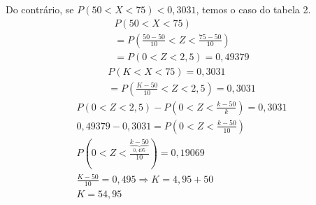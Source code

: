 \begin{example}
\begin{enumerate}[label=(\alph*)]
              Do contrário, se $P(50 < X < 75) < 0,3031$, temos o caso do tabela 2.
              \begin{align*}
                P(50 < X < 75)  \\
                =P(\frac{50-50}{10} < Z < \frac{75-50}{10}) \\
                =P(0 < Z < 2,5) = 0,49379
              \end{align*}
              \begin{align*}
                P(K < X < 75)  = 0,3031\\
                =P(\frac{K-50}{10}< Z <2,5)= 0,3031
              \end{align*}
              \begin{align*}
                P(0 < Z < 2,5)  - P(0 < Z  < \frac{k-50}{k})=0,3031 \\
                0,49379 - 0,3031 = P(0 < Z < \frac{k-50}{10}) \\
                P(0<Z < \frac{\underbrace{k-50}_{0,495}}{10})= 0,19069  \\
                \frac{K-50}{10}= 0,495 \Rightarrow  K=4,95 +50 \\
                K=54,95
              \end{align*}
          \end{enumerate}

      \end{example}    

